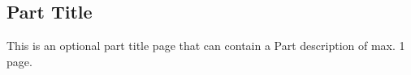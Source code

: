 %
%

\begin{partbacktext}
\part{Part Title}
\noindent This is an optional part title page that can contain a Part description of max. 1 page.

\end{partbacktext}